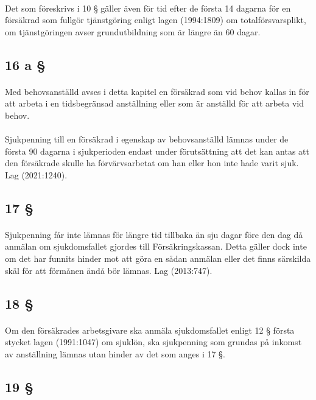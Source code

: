 \documentclass[a4paper,notitlepage,openany,10pt]{book}
\begin{document}
\paragraph*{}
Det som föreskrivs i 10 § gäller även för tid efter de första 14 dagarna för en försäkrad som fullgör tjänstgöring enligt lagen (1994:1809) om totalförsvarsplikt, om tjänstgöringen avser grundutbildning som är längre än 60 dagar.
\subsection*{16 a §}
\paragraph*{}
Med behovsanställd avses i detta kapitel en försäkrad som vid behov kallas in för att arbeta i en tidsbegränsad anställning eller som är anställd för att arbeta vid behov.
\paragraph*{}
Sjukpenning till en försäkrad i egenskap av behovsanställd lämnas under de första 90 dagarna i sjukperioden endast under förutsättning att det kan antas att den försäkrade skulle ha förvärvsarbetat om han eller hon inte hade varit sjuk.
Lag (2021:1240).
\subsection*{17 §}
\paragraph*{}
Sjukpenning får inte lämnas för längre tid tillbaka än sju dagar före den dag då anmälan om sjukdomsfallet gjordes till Försäkringskassan. Detta gäller dock inte om det har funnits hinder mot att göra en sådan anmälan eller det finns särskilda skäl för att förmånen ändå bör lämnas.
Lag (2013:747).
\subsection*{18 §}
\paragraph*{}
Om den försäkrades arbetsgivare ska anmäla sjukdomsfallet enligt 12 § första stycket lagen (1991:1047) om sjuklön, ska sjukpenning som grundas på inkomst av anställning lämnas utan hinder av det som anges i 17 §.
\subsection*{19 §}
\end{document}

